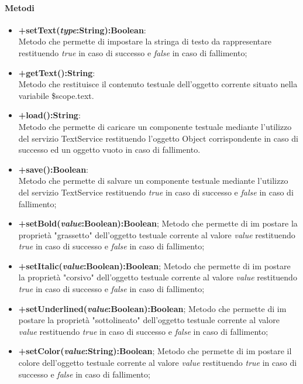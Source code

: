 	\paragraph{Metodi}
	\begin{itemize}
	\item \textbf{+setText(\textit{type}:String):Boolean}:\\
		Metodo che permette di impostare la stringa di testo da rappresentare restituendo \textit{true} in caso di successo e \textit{false} in caso di fallimento;
	\item \textbf{+getText():String}:\\
		Metodo che restituisce il contenuto testuale dell'oggetto corrente situato nella variabile \$scope.text.
	\item \textbf{+load():String}:\\	
		Metodo che permette di caricare un componente testuale mediante l'utilizzo del servizio TextService restituendo l'oggetto Object corrispondente in caso di successo ed un oggetto vuoto in caso di fallimento.	
	\item \textbf{+save():Boolean}:\\	
		Metodo che permette di salvare un componente testuale mediante l'utilizzo del servizio TextService restituendo \textit{true} in caso di successo e \textit{false} in caso di fallimento;
	\item \textbf{+setBold(\textit{value}:Boolean):Boolean};
		Metodo che permette di im postare la proprietà "grassetto" dell'oggetto testuale corrente al valore \textit{value} restituendo \textit{true} in caso di successo e \textit{false} in caso di fallimento;
	\item \textbf{+setItalic(\textit{value}:Boolean):Boolean};
		Metodo che permette di im postare la proprietà "corsivo" dell'oggetto testuale corrente al valore \textit{value} restituendo \textit{true} in caso di successo e \textit{false} in caso di fallimento;
	\item \textbf{+setUnderlined(\textit{value}:Boolean):Boolean};
		Metodo che permette di im postare la proprietà "sottolineato" dell'oggetto testuale corrente al valore \textit{value} restituendo \textit{true} in caso di successo e \textit{false} in caso di fallimento;
	\item \textbf{+setColor(\textit{value}:String):Boolean};
			Metodo che permette di im postare il colore dell'oggetto testuale corrente al valore \textit{value} restituendo \textit{true} in caso di successo e \textit{false} in caso di fallimento;
	
	\end{itemize}
